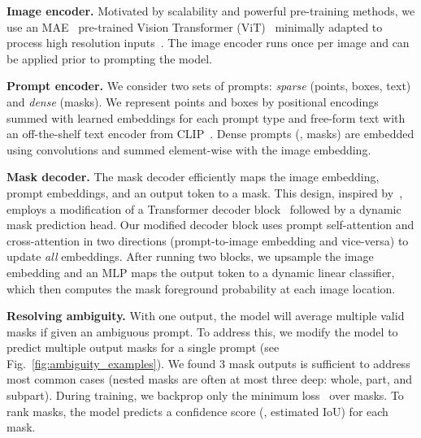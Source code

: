 \documentclass[10pt,twocolumn,letterpaper]{article}
\renewcommand{\paragraph}[1]{\vspace{1.25mm}\noindent\textbf{#1}}
\newcommand{\fig}[1]{Fig.~\ref{#1}}
\begin{document}
\paragraph{Image encoder.} Motivated by scalability and powerful pre-training methods, we use an MAE~\cite{he2022masked} pre-trained Vision Transformer (ViT)~\cite{Dosovitskiy2021} minimally adapted to process high resolution inputs~\cite{li2022exploring}. The image encoder runs once per image and can be applied prior to prompting the model.

\paragraph{Prompt encoder.} We consider two sets of prompts: \emph{sparse} (points, boxes, text) and \emph{dense} (masks). We represent points and boxes by positional encodings~\cite{tancik2020fourier} summed with learned embeddings for each prompt type and free-form text with an off-the-shelf text encoder from CLIP~\cite{Radford2021}. Dense prompts (\ie, masks) are embedded using convolutions and summed element-wise with the image embedding.

\paragraph{Mask decoder.} The mask decoder efficiently maps the image embedding, prompt embeddings, and an output token to a mask. This design, inspired by~\cite{Carion2020,cheng2021per}, employs a modification of a Transformer decoder block~\cite{Vaswani2017} followed by a dynamic mask prediction head. Our modified decoder block uses prompt self-attention and cross-attention in two directions (prompt-to-image embedding and vice-versa) to update \emph{all} embeddings. After running two blocks, we upsample the image embedding and an MLP maps the output token to a dynamic linear classifier, which then computes the mask foreground probability at each image location.

\paragraph{Resolving ambiguity.} With one output, the model will average multiple valid masks if given an ambiguous prompt. To address this, we modify the model to predict multiple output masks for a single prompt (see \fig{fig:ambiguity_examples}). We found 3 mask outputs is sufficient to address most common cases (nested masks are often at most three deep: whole, part, and subpart). During training, we backprop only the minimum loss~\cite{charpiat2008automatic,guzman2012multiple,li2018interactive} over masks. To rank masks, the model predicts a confidence score (\ie, estimated IoU) for each mask.
\end{document}
